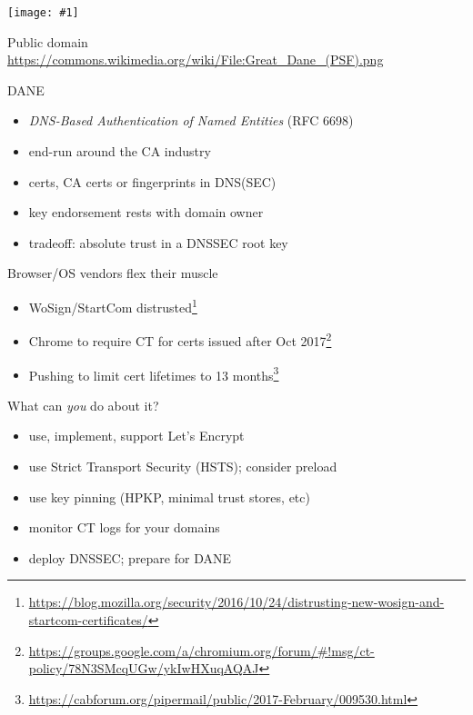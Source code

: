 \documentclass[ignorenonframetext,aspectratio=169]{beamer}
\makeatletter
\def\maxwidth{\ifdim\Gin@nat@width>\linewidth\linewidth\else\Gin@nat@width\fi}
\def\maxheight{\ifdim\Gin@nat@height>\textheight0.8\textheight\else\Gin@nat@height\fi}
\newcommand{\includegraphicsscaled}[1]{
    \texttt{[image: \#1]}
}
\makeatother
\begin{document}
\begin{frame}[plain]

\begin{center}
\includegraphicsscaled{Great_Dane_(PSF).png}
\end{center}

\tiny

Public domain \url{https://commons.wikimedia.org/wiki/File:Great_Dane_(PSF).png}

\end{frame}

\begin{frame}{DANE}

\begin{itemize}
\item
  \emph{DNS-Based Authentication of Named Entities} (RFC 6698)
\item
  end-run around the CA industry
\item
  certs, CA certs or fingerprints in DNS(SEC)
\item
  key endorsement rests with domain owner
\item
  tradeoff: absolute trust in a DNSSEC root key
\end{itemize}

\end{frame}

\begin{frame}{Browser/OS vendors flex their muscle}

\begin{itemize}
\item WoSign/StartCom distrusted\footnote[frame]{
  \url{https://blog.mozilla.org/security/2016/10/24/distrusting-new-wosign-and-startcom-certificates/}}
\item Chrome to require CT for certs issued after Oct 2017\footnote[frame]{
  \url{https://groups.google.com/a/chromium.org/forum/\#!msg/ct-policy/78N3SMcqUGw/ykIwHXuqAQAJ}}
\item Pushing to limit cert lifetimes to 13 months\footnote{
  \url{https://cabforum.org/pipermail/public/2017-February/009530.html}}
\end{itemize}

\end{frame}

\begin{frame}{What can \emph{you} do about it?}

\begin{itemize}
\item
  use, implement, support Let's Encrypt
\item
  use Strict Transport Security (HSTS); consider preload
\item
  use key pinning (HPKP, minimal trust stores, etc)
\item
  monitor CT logs for your domains
\item
  deploy DNSSEC; prepare for DANE
\end{itemize}

\end{frame}
\end{document}

